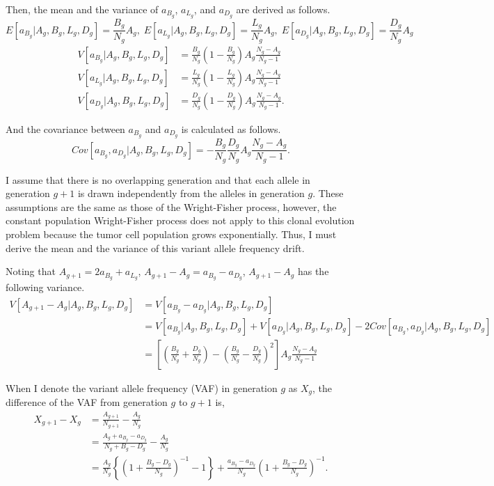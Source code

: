 \documentclass[12pt]{article}
\begin{document}
Then, the mean and the variance of $a_{B_g}$, $a_{L_g}$, and $a_{D_g}$ are derived as follows.
\begin{equation}
 E[a_{B_g} | A_g, B_g, L_g, D_g] = \frac{B_g}{N_g} A_g,\; E[a_{L_g} | A_g, B_g, L_g, D_g] = \frac{L_g}{N_g} A_g,\; E[a_{D_g} | A_g, B_g, L_g, D_g] = \frac{D_g}{N_g} A_g
\end{equation}
\begin{align}
 V[a_{B_g} | A_g, B_g, L_g, D_g] &= \frac{B_g}{N_g} \left(1 - \frac{B_g}{N_g}\right) A_g \frac{N_g - A_g}{N_g - 1}\\
 V[a_{L_g} | A_g, B_g, L_g, D_g] &= \frac{L_g}{N_g} \left(1 - \frac{L_g}{N_g}\right) A_g \frac{N_g - A_g}{N_g - 1}\\
 V[a_{D_g} | A_g, B_g, L_g, D_g] &= \frac{D_g}{N_g} \left(1 - \frac{D_g}{N_g}\right) A_g \frac{N_g - A_g}{N_g - 1}.
\end{align}

And the covariance between $a_{B_g}$ and $a_{D_g}$ is calculated as follows.
\begin{equation}
 Cov[a_{B_g}, a_{D_g} | A_g, B_g, L_g, D_g] = - \frac{B_g}{N_g} \frac{D_g}{N_g} A_g \frac{N_g - A_g}{N_g - 1}.
\end{equation}

I assume that there is no overlapping generation and that each allele in generation $g+1$ is drawn independently from the alleles in generation $g$. These assumptions are the same as those of the Wright-Fisher process, however, the constant population Wright-Fisher process does not apply to this clonal evolution problem because the tumor cell population grows exponentially. Thus, I must derive the mean and the variance of this variant allele frequency drift.

Noting that $A_{g+1} = 2a_{B_g} + a_{L_g}$, $A_{g+1} - A_g = a_{B_g} - a_{D_g}$, $A_{g+1} - A_g$ has the following variance.
\begin{align}
 V[A_{g+1} - A_g | A_g, B_g, L_g, D_g] &= V[a_{B_g} - a_{D_g} | A_g, B_g, L_g, D_g]\nonumber\\
 &= V[a_{B_g} | A_g, B_g, L_g, D_g] + V[a_{D_g} | A_g, B_g, L_g, D_g] - 2Cov[a_{B_g}, a_{D_g} | A_g, B_g, L_g, D_g]\nonumber\\
 &= \left[ \left( \frac{B_g}{N_g} + \frac{D_g}{N_g} \right) - \left( \frac{B_g}{N_g} - \frac{D_g}{N_g} \right)^2 \right] A_g \frac{N_g - A_g}{N_g - 1}
\end{align}

When I denote the variant allele frequency (VAF) in generation $g$ as $X_g$, the difference of the VAF from generation $g$ to $g+1$ is,
\begin{align}
 X_{g+1} - X_g &= \frac{A_{g+1}}{N_{g+1}} - \frac{A_g}{N_g} \nonumber\\
 & = \frac{A_g + a_{B_g} - a_{D_g}}{N_g + B_g - D_g} - \frac{A_g}{N_g} \nonumber \\
 & = \frac{A_g}{N_g} \left\{ \left(1 + \frac{B_g - D_g}{N_g}\right)^{-1} - 1 \right\} + \frac{a_{B_g} - a_{D_g}}{N_g} \left( 1 + \frac{B_g - D_g}{N_g} \right)^{-1}.
\end{align}
\end{document}
